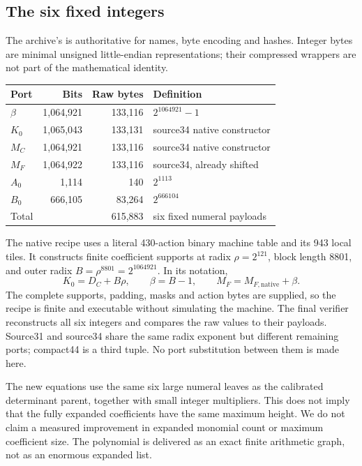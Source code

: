 \documentclass[11pt]{article}
\theoremstyle{remark}\newtheorem{remark}[theorem]{Remark}
\newcommand{\file}[1]{\path{#1}}
\begin{document}
\subsection{The six fixed integers}
The archive's \file{coefficients/BINDING.json} is authoritative for names,
byte encoding and hashes. Integer bytes are minimal unsigned little-endian
representations; their compressed wrappers are not part of the mathematical
identity.
\begin{center}\small
\begin{tabular}{@{}lrrl@{}}\toprule
Port & Bits & Raw bytes & Definition\\\midrule
$\beta$ &1,064,921&133,116&$2^{1064921}-1$\\
$K_0$ &1,065,043&133,131&source34 native constructor\\
$M_C$ &1,064,921&133,116&source34 native constructor\\
$M_F$ &1,064,922&133,116&source34, already shifted\\
$A_0$ &1,114&140&$2^{1113}$\\
$B_0$ &666,105&83,264&$2^{666104}$\\\midrule
Total &&615,883&six fixed numeral payloads\\\bottomrule
\end{tabular}
\end{center}
The native recipe uses a literal 430-action binary machine table and its
943 local tiles. It constructs finite coefficient supports at radix
$\rho=2^{121}$, block length 8801, and outer radix
$B=\rho^{8801}=2^{1064921}$. In its notation,
\[
 K_0=D_C+B\rho,\qquad \beta=B-1,
 \qquad M_F=M_{F,\mathrm{native}}+\beta.
\]
The complete supports, padding, masks and action bytes are supplied, so the
recipe is finite and executable without simulating the machine. The final
verifier reconstructs all six integers and compares the raw values to their
payloads. Source31 and source34 share the same radix exponent but different
remaining ports; compact44 is a third tuple. No port substitution between
them is made here.

The new equations use the same six large numeral leaves as the calibrated
determinant parent, together with small integer multipliers. This does not
imply that the fully expanded coefficients have the same maximum height.
We do not claim a measured improvement in expanded monomial count or maximum
coefficient size. The polynomial is delivered as an exact finite arithmetic
graph, not as an enormous expanded list.
\end{document}
